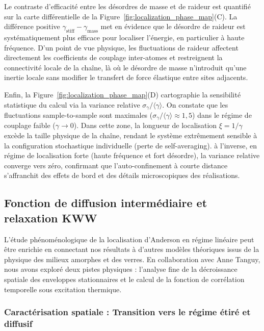 Le contraste d'efficacité entre les désordres de masse et de raideur est quantifié sur la carte différentielle de la Figure~\ref{fig:localization_phase_map}(C). La différence positive $\gamma_{\text{stiff}} - \gamma_{\text{mass}}$ met en évidence que le désordre de raideur est systématiquement plus efficace pour localiser l'énergie, en particulier à haute fréquence. D'un point de vue physique, les fluctuations de raideur affectent directement les coefficients de couplage inter-atomes et restreignent la connectivité locale de la chaîne, là où le désordre de masse n'introduit qu'une inertie locale sans modifier le transfert de force élastique entre sites adjacents.

Enfin, la Figure~\ref{fig:localization_phase_map}(D) cartographie la sensibilité statistique du calcul via la variance relative $\sigma_\gamma / \langle \gamma \rangle$. On constate que les fluctuations sample-to-sample sont maximales ($\sigma_\gamma / \langle \gamma \rangle \approx 1{,}5$) dans le régime de couplage faible ($\gamma \to 0$). Dans cette zone, la longueur de localisation $\xi = 1/\gamma$ excède la taille physique de la chaîne, rendant le système extrêmement sensible à la configuration stochastique individuelle (perte de self-averaging). à l'inverse, en régime de localisation forte (haute fréquence et fort désordre), la variance relative converge vers zéro, confirmant que l'auto-confinement à courte distance s'affranchit des effets de bord et des détails microscopiques des réalisations.

\subsection{Fonction de diffusion intermédiaire et relaxation KWW}

L'étude phénoménologique de la localisation d'Anderson en régime linéaire peut être enrichie en connectant nos résultats à d'autres modèles théoriques issus de la physique des milieux amorphes et des verres. En collaboration avec Anne Tanguy, nous avons exploré deux pistes physiques : l'analyse fine de la décroissance spatiale des enveloppes stationnaires et le calcul de la fonction de corrélation temporelle sous excitation thermique.

\subsubsection{Caractérisation spatiale : Transition vers le régime étiré et diffusif}

